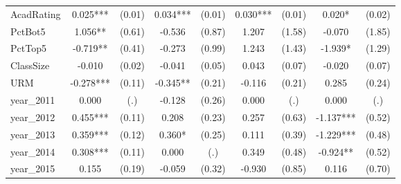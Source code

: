 \begin{sidewaystable}[htb]
\begin{threeparttable}
\begin{tabular}{l|c|c|c|c|c|c|c|c}
      AcadRating        & 0.025***                     & (0.01)                       & 0.034***                    & (0.01)               & 0.030***             & (0.01)               & 0.020*               & (0.02)               \\
      PctBot5           & 1.056**                      & (0.61)                       & -0.536                      & (0.87)               & 1.207                & (1.58)               & -0.070               & (1.85)               \\
      PctTop5           & -0.719**                     & (0.41)                       & -0.273                      & (0.99)               & 1.243                & (1.43)               & -1.939*              & (1.29)               \\
      ClassSize         & -0.010                       & (0.02)                       & -0.041                      & (0.05)               & 0.043                & (0.07)               & -0.020               & (0.07)               \\
      URM               & -0.278***                    & (0.11)                       & -0.345**                    & (0.21)               & -0.116               & (0.21)               & 0.285                & (0.24)               \\
      year\_2011        & 0.000                        & (.)                          & -0.128                      & (0.26)               & 0.000                & (.)                  & 0.000                & (.)                  \\
      year\_2012        & 0.455***                     & (0.11)                       & 0.208                       & (0.23)               & 0.257                & (0.63)               & -1.137***            & (0.52)               \\
      year\_2013        & 0.359***                     & (0.12)                       & 0.360*                      & (0.25)               & 0.111                & (0.39)               & -1.229***            & (0.48)               \\
      year\_2014        & 0.308***                     & (0.11)                       & 0.000                       & (.)                  & 0.349                & (0.48)               & -0.924**             & (0.52)               \\
      year\_2015        & 0.155                        & (0.19)                       & -0.059                      & (0.32)               & -0.930               & (0.85)               & 0.116                & (0.70)               \\

\end{tabular}
\end{threeparttable}
\end{sidewaystable}
